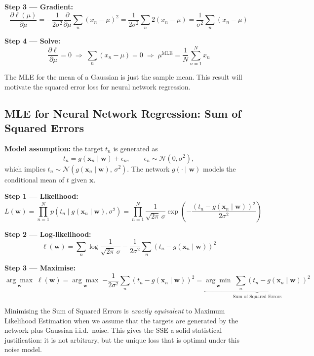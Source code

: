 \documentclass[11pt,a4paper]{article}
\begin{document}
\textbf{Step 3 — Gradient:}
\[
\frac{\partial \ell(\mu)}{\partial \mu} = -\frac{1}{2\sigma^2}\frac{\partial}{\partial \mu}\sum_n(x_n - \mu)^2 = \frac{1}{2\sigma^2}\sum_n 2(x_n - \mu) = \frac{1}{\sigma^2}\sum_n (x_n - \mu)
\]

\textbf{Step 4 — Solve:}
\[
\frac{\partial \ell}{\partial \mu} = 0 \;\Rightarrow\; \sum_n (x_n - \mu) = 0 \;\Rightarrow\; \mu^{\mathrm{MLE}} = \frac{1}{N}\sum_{n=1}^N x_n
\]

The MLE for the mean of a Gaussian is just the sample mean. This result will motivate the squared error loss for neural network regression.

\subsection{MLE for Neural Network Regression: Sum of Squared Errors}

\textbf{Model assumption:} the target $t_n$ is generated as
\[
t_n = g(\mathbf{x}_n \mid \mathbf{w}) + \epsilon_n, \qquad \epsilon_n \sim \mathcal{N}(0, \sigma^2),
\]
which implies $t_n \sim \mathcal{N}(g(\mathbf{x}_n \mid \mathbf{w}),\, \sigma^2)$. The network $g(\cdot \mid \mathbf{w})$ models the conditional mean of $t$ given $\mathbf{x}$.

\textbf{Step 1 — Likelihood:}
\[
L(\mathbf{w}) = \prod_{n=1}^N p(t_n \mid g(\mathbf{x}_n \mid \mathbf{w}), \sigma^2)
= \prod_{n=1}^N \frac{1}{\sqrt{2\pi}\,\sigma}\exp\!\left(-\frac{(t_n - g(\mathbf{x}_n \mid \mathbf{w}))^2}{2\sigma^2}\right)
\]

\textbf{Step 2 — Log-likelihood:}
\[
\ell(\mathbf{w}) = \sum_n \log\frac{1}{\sqrt{2\pi}\,\sigma} - \frac{1}{2\sigma^2}\sum_n (t_n - g(\mathbf{x}_n \mid \mathbf{w}))^2
\]

\textbf{Step 3 — Maximise:}
\[
\underset{\mathbf{w}}{\arg\max}\;\ell(\mathbf{w}) = \underset{\mathbf{w}}{\arg\max}\;{-\frac{1}{2\sigma^2}\sum_n (t_n - g(\mathbf{x}_n \mid \mathbf{w}))^2}
= \underbrace{\underset{\mathbf{w}}{\arg\min}\;\sum_n (t_n - g(\mathbf{x}_n \mid \mathbf{w}))^2}_{\text{Sum of Squared Errors}}
\]

\begin{insightbox}[SSE loss = MLE under Gaussian noise assumption]
Minimising the Sum of Squared Errors is \emph{exactly equivalent} to Maximum Likelihood Estimation when we assume that the targets are generated by the network plus Gaussian i.i.d.\ noise. This gives the SSE a solid statistical justification: it is not arbitrary, but the unique loss that is optimal under this noise model.
\end{insightbox}
\end{document}
